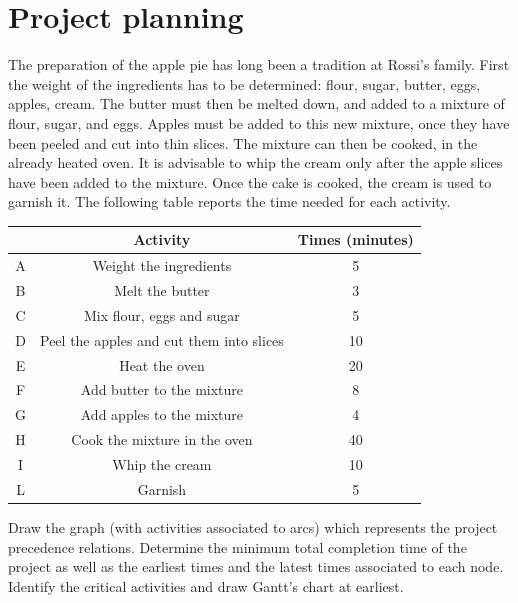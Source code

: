 \documentclass[12pt, a4paper]{report}
\begin{document}
    \newpage

    \section{Project planning}
        The preparation of the apple pie has long been a tradition at Rossi's family. First the weight of the ingredients has to be determined: flour, sugar, butter, eggs, 
        apples, cream. The butter must then be melted down, and added to a mixture of flour, sugar, and eggs. Apples must be added to this new mixture, once they have been 
        peeled and cut into thin slices. The mixture can then be cooked, in the already heated oven. It is advisable to whip the cream only after the apple slices have 
        been added to the mixture. Once the cake is cooked, the cream is used to garnish it. The following table reports the time needed for each activity.
        \begin{table}[H]
            \centering
            \begin{tabular}{ccc}
            \hline
            \textbf{} & \textbf{Activity}                        & \textbf{Times (minutes)} \\ \hline
            A         & Weight the ingredients                   & 5                        \\
            B         & Melt the butter                          & 3                        \\
            C         & Mix flour, eggs and sugar                & 5                        \\
            D         & Peel the apples and cut them into slices & 10                       \\
            E         & Heat the oven                            & 20                       \\
            F         & Add butter to the mixture                & 8                        \\
            G         & Add apples to the mixture                & 4                        \\
            H         & Cook the mixture in the oven             & 40                       \\
            I         & Whip the cream                           & 10                       \\
            L         & Garnish                                  & 5                        \\ \hline
            \end{tabular}
        \end{table}
        Draw the graph (with activities associated to arcs) which represents the project precedence relations. Determine the minimum total completion time of the project 
        as well as the earliest times and the latest times associated to each node. Identify the critical activities and draw Gantt's chart at earliest.
\end{document}
